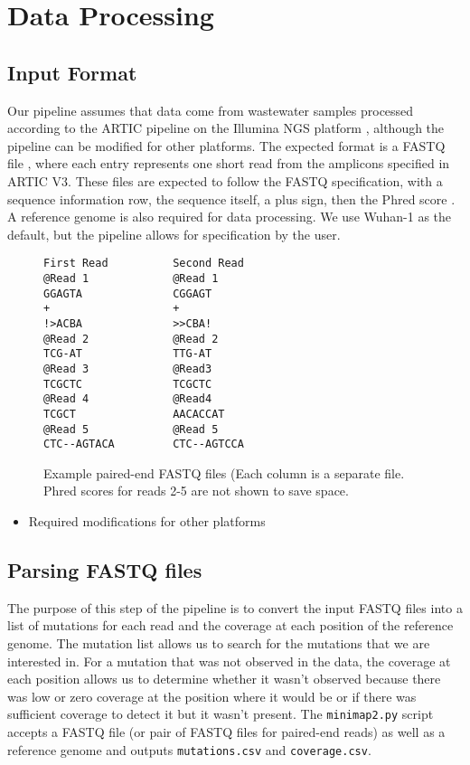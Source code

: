 \documentclass{article}
\newenvironment{tightemize}
{ \begin{itemize}
    \setlength{\itemsep}{0pt}
    \setlength{\parskip}{0pt}
    \setlength{\parsep}{0pt}     }
{ \end{itemize}                  }
\begin{document}
\section{Data Processing}

\subsection{Input Format}

Our pipeline assumes that data come from wastewater samples processed according to the ARTIC pipeline \citep{needed} on the Illumina NGS platform \citep{needed}, although the pipeline can be modified for other platforms.
The expected format is a FASTQ file \citep{needed}, where each entry represents one short read from the amplicons specified in ARTIC V3. %
These files are expected to follow the FASTQ specification, with a sequence information row, the sequence itself, a plus sign, then the Phred score \citep{needed}.
A reference genome is also required for data processing.
We use Wuhan-1 \citep{needed} as the default, but the pipeline allows for specification by the user.


\begin{figure}[h!]
\begin{verbatim}
First Read          Second Read
@Read 1             @Read 1
GGAGTA              CGGAGT
+                   +
!>ACBA              >>CBA!
@Read 2             @Read 2
TCG-AT              TTG-AT
@Read 3             @Read3  
TCGCTC              TCGCTC
@Read 4             @Read4
TCGCT               AACACCAT
@Read 5             @Read 5
CTC--AGTACA         CTC--AGTCCA
\end{verbatim}
\caption{Example paired-end FASTQ files (Each column is a separate file. Phred scores for reads 2-5 are not shown to save space.}
\label{short-reads}
\end{figure}



\begin{tightemize} 
    \item Required modifications for other platforms
\end{tightemize}

\subsection{Parsing FASTQ files}

The purpose of this step of the pipeline is to convert the input FASTQ files into a list of mutations for each read and the coverage at each position of the reference genome.
The mutation list allows us to search for the mutations that we are interested in.
For a mutation that was not observed in the data, the coverage at each position allows us to determine whether it wasn't observed because there was low or zero coverage at the position where it would be or if there was sufficient coverage to detect it but it wasn't present.
The \texttt{minimap2.py} script accepts a FASTQ file (or pair of FASTQ files for paired-end reads) as well as a reference genome and outputs \texttt{mutations.csv} and \texttt{coverage.csv}.
\end{document}
